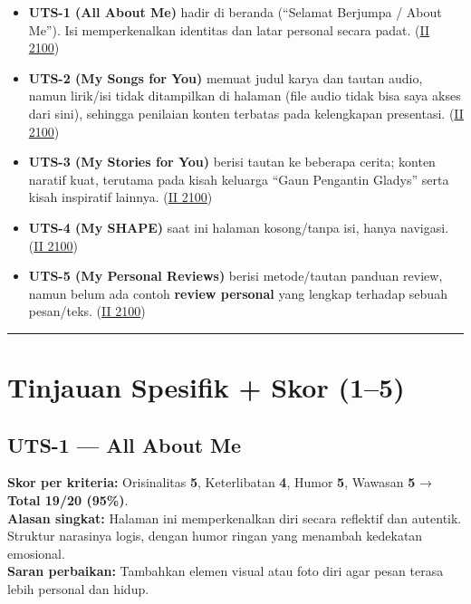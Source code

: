 \documentclass[
  letterpaper,
  DIV=11,
  numbers=noendperiod]{scrreprt}
\providecommand{\tightlist}{%
  \setlength{\itemsep}{0pt}\setlength{\parskip}{0pt}}
\begin{document}
\begin{itemize}
\tightlist
\item
  \textbf{UTS-1 (All About Me)} hadir di beranda (``Selamat Berjumpa /
  About Me''). Isi memperkenalkan identitas dan latar personal secara
  padat. (\href{https://ii-2100.github.io/all-about-me/}{II 2100})
\item
  \textbf{UTS-2 (My Songs for You)} memuat judul karya dan tautan audio,
  namun lirik/isi tidak ditampilkan di halaman (file audio tidak bisa
  saya akses dari sini), sehingga penilaian konten terbatas pada
  kelengkapan presentasi.
  (\href{https://ii-2100.github.io/all-about-me/My_Song_for_You/index.html}{II
  2100})
\item
  \textbf{UTS-3 (My Stories for You)} berisi tautan ke beberapa cerita;
  konten naratif kuat, terutama pada kisah keluarga ``Gaun Pengantin
  Gladys'' serta kisah inspiratif lainnya.
  (\href{https://ii-2100.github.io/all-about-me/My_Stories_for_You/index.html}{II
  2100})
\item
  \textbf{UTS-4 (My SHAPE)} saat ini halaman kosong/tanpa isi, hanya
  navigasi.
  (\href{https://ii-2100.github.io/all-about-me/My_Shapes/index.html}{II
  2100})
\item
  \textbf{UTS-5 (My Personal Reviews)} berisi metode/tautan panduan
  review, namun belum ada contoh \textbf{review personal} yang lengkap
  terhadap sebuah pesan/teks.
  (\href{https://ii-2100.github.io/all-about-me/My_Personal_Reviews/index.html}{II
  2100})
\end{itemize}

\begin{center}\rule{0.5\linewidth}{0.5pt}\end{center}

\section{Tinjauan Spesifik + Skor
(1--5)}\label{tinjauan-spesifik-skor-15}

\subsection{\texorpdfstring{\textbf{UTS-1 --- All About
Me}}{UTS-1 --- All About Me}}\label{uts-1-all-about-me-1}

\textbf{Skor per kriteria:} Orisinalitas \textbf{5}, Keterlibatan
\textbf{4}, Humor \textbf{5}, Wawasan \textbf{5} → \textbf{Total 19/20
(95\%)}.\\
\textbf{Alasan singkat:} Halaman ini memperkenalkan diri secara
reflektif dan autentik. Struktur narasinya logis, dengan humor ringan
yang menambah kedekatan emosional.\\
\textbf{Saran perbaikan:} Tambahkan elemen visual atau foto diri agar
pesan terasa lebih personal dan hidup.
\end{document}
